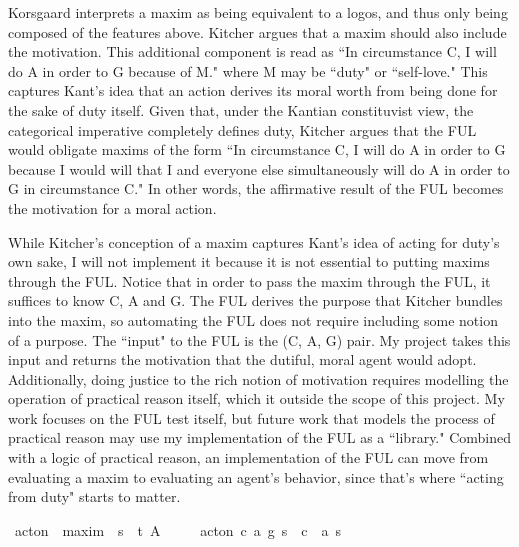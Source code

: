 \begin{isabellebody}
{Korsgaard interprets a maxim as being equivalent to a logos, and thus only being composed of the features
above. Kitcher \cite{whatisamaxim} argues that a maxim should also include the motivation. This additional component is read 
as ``In circumstance C, I will do A in order to G because of M." where M may be ``duty" or ``self-love."
This captures Kant's idea that an action derives its moral worth from being done for the sake of duty itself.
Given that, under the Kantian constituvist view, the categorical
imperative completely defines duty, Kitcher argues that the FUL would obligate maxims of the form 
``In circumstance C, I will do A in order to G because I would will that I and everyone else simultaneously
will do A in order to G in circumstance C." In other words, the affirmative result of the FUL becomes 
the motivation for a moral action.

While Kitcher's conception of a maxim captures Kant's idea of acting for duty's own sake, I will not implement it 
because it is not essential to putting maxims through the FUL. 
Notice that in order to pass the maxim through the FUL, it suffices to know C, A and G. The FUL
derives the purpose that Kitcher bundles into the maxim, so automating the FUL does not require 
including some notion of a purpose. The ``input" to the FUL is the (C, A, G) pair. My project takes 
this input and returns the motivation that the dutiful, moral agent would adopt. Additionally, doing
justice to the rich notion of motivation requires modelling the operation of practical reason itself, 
which it outside the scope of this project. My work focuses on the FUL test itself, but future work that 
models the process of practical reason may use my implementation of the FUL as a ``library." Combined 
with a logic of practical reason, an implementation of the FUL can move from evaluating a maxim to 
evaluating an agent's behavior, since that's where ``acting from duty" starts to matter.%
}\isanewline
\isanewline
{}\isamarkupfalse%
\ act{\isacharunderscore}on\ {\isacharcolon}{\isacharcolon}\ {\isachardoublequoteopen}maxim\ {\isasymRightarrow}\ s{\isasymRightarrow}\ \ t{\isachardoublequoteclose}\ {\isacharparenleft}{\isachardoublequoteopen}A\ {\isacharunderscore}\ {\isacharunderscore}{\isachardoublequoteclose}{\isacharparenright}\isanewline
\ \ \ {\isachardoublequoteopen}act{\isacharunderscore}on\ {\isacharparenleft}c{\isacharcomma}\ a{\isacharcomma}\ g{\isacharparenright}\ s\ {\isacharequal}\ {\isacharparenleft}c\ \isactrlbold {\isasymrightarrow}\ {\isacharparenleft}a\ s{\isacharparenright}{\isacharparenright}{\isachardoublequoteclose}\isanewline
\ %
\end{isabellebody}
